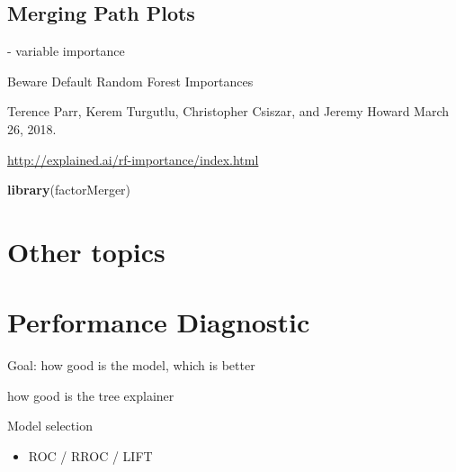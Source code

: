 \documentclass[]{krantz}
\newenvironment{Shaded}{\begin{snugshade}}{\end{snugshade}}
\newcommand{\KeywordTok}[1]{\textcolor[rgb]{0.13,0.29,0.53}{\textbf{#1}}}
\newcommand{\NormalTok}[1]{#1}
\providecommand{\tightlist}{%
  \setlength{\itemsep}{0pt}\setlength{\parskip}{0pt}}
\theoremstyle{definition}
\theoremstyle{definition}
\theoremstyle{definition}
\theoremstyle{remark}
\begin{document}
\hypertarget{merging-path-plots}{%
\subsection{Merging Path Plots}\label{merging-path-plots}}

\citep{demsar2018}

\citep{RJ2017016} \citep{MAGIX}

\citep{R-factorMerger}

\citep{Strobl2007} \citep{Strobl2008} - variable importance

\citep{2018arXiv180101489F}

Beware Default Random Forest Importances

Terence Parr, Kerem Turgutlu, Christopher Csiszar, and Jeremy Howard
March 26, 2018.

\url{http://explained.ai/rf-importance/index.html}

\begin{Shaded}
\begin{Highlighting}[]
\KeywordTok{library}\NormalTok{(factorMerger)}
\end{Highlighting}
\end{Shaded}

\hypertarget{other-topics}{%
\section{Other topics}\label{other-topics}}

\citep{R-randomForestExplainer} \citep{R-ICEbox} \citep{R-ALEPlot}

\citep{R-modelDown}

\hypertarget{modelComparisons}{%
\section{Performance Diagnostic}\label{modelComparisons}}

Goal: how good is the model, which is better

\citep{Piltaver2016} how good is the tree explainer

Model selection

\begin{itemize}
\tightlist
\item
  ROC / RROC / LIFT
\end{itemize}
\end{document}
